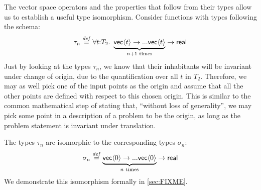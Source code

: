 \begin{example}
  The vector space operators and the properties that follow from their
  types allow us to establish a useful type isomorphism. Consider
  functions with types following the schema:
  \begin{displaymath}
    \tau_{n} \isDefinedAs \forall t\mathord:T_2.\ \underbrace{\mathsf{vec}\langle t \rangle \to ... \mathsf{vec}\langle t \rangle}_{n+1\textrm{ times}} \to \mathsf{real}
  \end{displaymath}
  Just by looking at the types $\tau_{n}$, we know that their
  inhabitants will be invariant under change of origin, due to the
  quantification over all $t$ in $T_2$. Therefore, we may as well pick
  one of the input points as the origin and assume that all the other
  points are defined with respect to this chosen origin. This is
  similar to the common mathematical step of stating that, ``without
  loss of generality'', we may pick some point in a description of a
  problem to be the origin, as long as the problem statement is
  invariant under translation.

  The types $\tau_{n}$ are isomorphic to the corresponding types
  $\sigma_{n}$:
  \begin{displaymath}
    \sigma_{n} \stackrel{\mathit{def}}= \underbrace{\mathsf{vec}\langle 0 \rangle \to ... \mathsf{vec}\langle 0 \rangle}_{n\textrm{ times}} \to \mathsf{real}
  \end{displaymath}
  We demonstrate this isomorphism formally in \autoref{sec:FIXME}.

\end{example}

